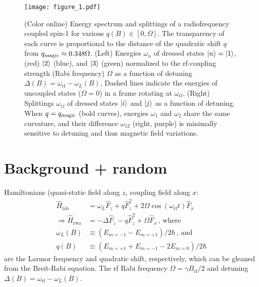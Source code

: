 \documentclass[aps,prl,reprint,superscriptaddress,floatfix]{revtex4-1}
\begin{document}
\begin{figure}
    \centering
    \texttt{[image: figure\_1.pdf]}
    \caption{
    \label{fig:eigensystem_schematic}
        (Color online)
        Energy spectrum and splittings of a radiofrequency coupled spin-1 for various $q(B)\in[0,\Omega]$.
        The transparency of each curve is proportional to the distance of the quadratic shift $q$ from $q_{\text{magic}}\approx 0.348\Omega$.
        (Left) Energies $\omega_n$ of dressed states $\vert n \rangle =\vert 1 \rangle $, (red) $\vert 2 \rangle $ (blue), and $\vert 3 \rangle $ (green) normalized to the rf-coupling strength (Rabi frequency) $\Omega$ as a function of detuning $\Delta(B)=\omega_{\text{rf}}-\omega_L(B)$,
        Dashed lines indicate the energies of uncoupled states ($\Omega=0$) in a frame rotating at $\omega_{\text{rf}}$.
        (Right) Splittings $\omega_{ij}$ of dressed states $\vert i \rangle $ and $\vert j \rangle $ as a function of detuning.
        When $q=q_{\text{magic}}$ (bold curves), energies $\omega_1$ and $\omega_2$ share the same curvature, and their difference $\omega_{12}$ (right, purple) is minimally sensitive to detuning and thus magnetic field variations. 
    }
\end{figure}

\section{Background + random}
\label{sec:background}
Hamiltonians (quasi-static field along $z$, coupling field along $x$:
    \begin{align*}
        \hat{H}_{\text{lab}} &= \omega_L \hat{F}_z + q \hat{F}_z^2 + 2\Omega \cos (\omega_{\text{rf}} t) \hat{F}_x \\
        \Rightarrow \hat{H}_{\text{rwa}} &= -\Delta \hat{F}_z - q \hat{F}_z^2 + \Omega \hat{F}_x \, \text{, where} \\
        \omega_L(B) &\equiv (E_{m=-1} - E_{m=+1})/2\hbar \, \text{, and} \\
        q(B) &\equiv (E_{m=+1} + E_{m=-1} - 2 E_{m=0})/2\hbar
    \end{align*}
    are the Larmor frequency and quadratic shift, respectively, which can be gleaned from the Breit-Rabi equation.
    The rf Rabi frequency $\Omega = \gamma B_{\text{rf}}/2$ and detuning $\Delta(B) = \omega_{\text{rf}} - \omega_L(B)$.
\end{document}
